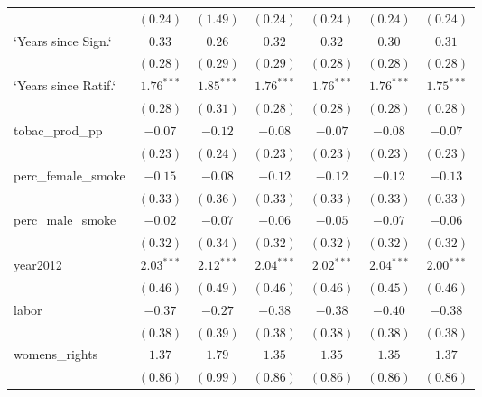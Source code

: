 \begin{table}[!h]
\begin{center}
\begin{tabular}{l c c c c c c }
                        & $(0.24)$     & $(1.49)$     & $(0.24)$     & $(0.24)$     & $(0.24)$     & $(0.24)$     \\
`Years since Sign.`     & $0.33$       & $0.26$       & $0.32$       & $0.32$       & $0.30$       & $0.31$       \\
                        & $(0.28)$     & $(0.29)$     & $(0.29)$     & $(0.28)$     & $(0.28)$     & $(0.28)$     \\
`Years since Ratif.`    & $1.76^{***}$ & $1.85^{***}$ & $1.76^{***}$ & $1.76^{***}$ & $1.76^{***}$ & $1.75^{***}$ \\
                        & $(0.28)$     & $(0.31)$     & $(0.28)$     & $(0.28)$     & $(0.28)$     & $(0.28)$     \\
tobac\_prod\_pp         & $-0.07$      & $-0.12$      & $-0.08$      & $-0.07$      & $-0.08$      & $-0.07$      \\
                        & $(0.23)$     & $(0.24)$     & $(0.23)$     & $(0.23)$     & $(0.23)$     & $(0.23)$     \\
perc\_female\_smoke     & $-0.15$      & $-0.08$      & $-0.12$      & $-0.12$      & $-0.12$      & $-0.13$      \\
                        & $(0.33)$     & $(0.36)$     & $(0.33)$     & $(0.33)$     & $(0.33)$     & $(0.33)$     \\
perc\_male\_smoke       & $-0.02$      & $-0.07$      & $-0.06$      & $-0.05$      & $-0.07$      & $-0.06$      \\
                        & $(0.32)$     & $(0.34)$     & $(0.32)$     & $(0.32)$     & $(0.32)$     & $(0.32)$     \\
year2012                & $2.03^{***}$ & $2.12^{***}$ & $2.04^{***}$ & $2.02^{***}$ & $2.04^{***}$ & $2.00^{***}$ \\
                        & $(0.46)$     & $(0.49)$     & $(0.46)$     & $(0.46)$     & $(0.45)$     & $(0.46)$     \\
labor                   & $-0.37$      & $-0.27$      & $-0.38$      & $-0.38$      & $-0.40$      & $-0.38$      \\
                        & $(0.38)$     & $(0.39)$     & $(0.38)$     & $(0.38)$     & $(0.38)$     & $(0.38)$     \\
womens\_rights          & $1.37$       & $1.79$       & $1.35$       & $1.35$       & $1.35$       & $1.37$       \\
                        & $(0.86)$     & $(0.99)$     & $(0.86)$     & $(0.86)$     & $(0.86)$     & $(0.86)$     \\

\end{tabular}
\end{center}
\end{table}
